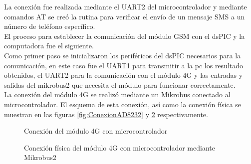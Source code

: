 La conexión fue realizada mediante el UART2 del microcontrolador y mediante comandos AT se creó la rutina para verificar el envío de un mensaje SMS a un número de teléfono específico.\\

El proceso para establecer la comunicación del módulo GSM con el dsPIC y la computadora fue el siguiente.\\

Como primer paso se inicializaron los periféricos del dsPIC necesarios para la comunicación, en este caso fue el UART1 para transmitir a la pc los resultado obtenidos, el UART2 para la comunicación con el módulo 4G y las entradas y salidas del mikrobus2 que necesita el módulo para funcionar correctamente. \\

La conexión del módulo 4G se realizó mediante un Mikrobus conectado al microcontrolador. El esquema de esta conexión, así como la conexión física se muestran en las figuras \ref{fig:ConexionAD8232} y \ref{fig:ConexionFisicaGSM} respectivamente.

	\begin{figure}[htbp!]
		\centering
		\caption{Conexión del módulo 4G con microcontrolador}
		\label{fig:ConexionGSM}
	\end{figure}
	
	\begin{figure}[htbp!]
		\centering
		\caption{Conexión física del módulo 4G con microcontrolador mediante Mikrobus2}
		\label{fig:ConexionFisicaGSM}
	\end{figure}
	

